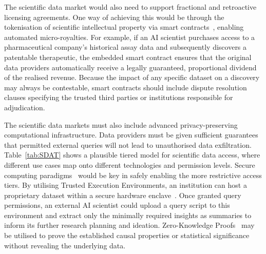 \documentclass[11pt, a4paper, twocolumn, goog]{google}
\begin{document}
The scientific data market would also need to support fractional and retroactive licensing agreements. One way of achieving this would be through the tokenisation of scientific intellectual property via smart contracts~\citep{bodo2018blockchain}, enabling automated micro-royalties. For example, if an AI scientist purchases access to a pharmaceutical company's historical assay data and subsequently discovers a patentable therapeutic, the embedded smart contract ensures that the original data providers automatically receive a legally guaranteed, proportional dividend of the realised revenue. Because the impact of any specific dataset on a discovery may always be contestable, smart contracts should include dispute resolution clauses specifying the trusted third parties or institutions responsible for adjudication.

The scientific data markets must also include advanced privacy-preserving computational infrastructure. Data providers must be given sufficient guarantees that permitted external queries will not lead to unauthorised data exfiltration. Table~\ref{tab:SDAT} shows a plausible tiered model for scientific data access, where different use cases map onto different technologies and permission levels. Secure computing paradigms~\citep{zhu2020enabling, li2023survey} would be key in safely enabling the more restrictive access tiers. By utilising Trusted Execution Environments, an institution can host a proprietary dataset within a secure hardware enclave~\citep{bahmani2021cure}. Once granted query permissions, an external AI scientist could upload a query script to this environment and extract only the minimally required insights as summaries to inform its further research planning and ideation. Zero-Knowledge Proofs~\citep{doi:10.1137/0218012} may be utilised to prove the established causal properties or statistical significance without revealing the underlying data.
\end{document}

